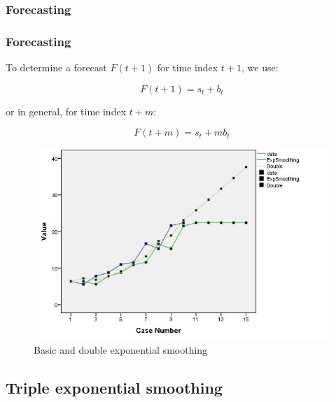 \documentclass{beamer}
\begin{document}
\subsubsection{Forecasting}

\begin{frame}
  \frametitle{Forecasting}
  
  To determine a forecast $F(t+1)$ for time index $t+1$, we use:

  \[ F(t+1) = s_t + b_t \]

  or in general, for time index $t+m$:

  \[ F(t+m) = s_t + m b_t \]
\end{frame}

\begin{frame}
  \begin{figure}
    \centering
    \includegraphics[width=\textwidth]{img/tijdreeks71}
    \caption{Basic and double exponential smoothing}
    \label{fig:tijdreeks71}
  \end{figure}
\end{frame}

\subsection{Triple exponential smoothing}
\end{document}
